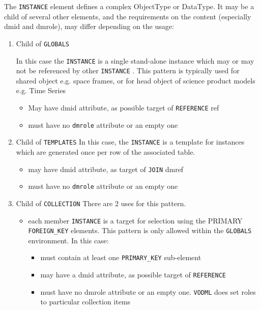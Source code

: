The \texttt{INSTANCE} element defines a complex ObjectType or DataType.
It may be a child of several other elements, and the requirements on
the content (especially dmid and dmrole), may differ depending on
the usage:


\begin{enumerate}
\item Child of \texttt{GLOBALS}

   In this case the \texttt{INSTANCE} is a single stand-alone instance which
   may or may not be referenced by other \texttt{INSTANCE} . This pattern is typically used for 
   shared object e.g. space frames, or for head object of science product models e.g. Time Series
  \begin{itemize}
     \item May have dmid attribute, as possible target of \texttt{REFERENCE} ref
     \item must have no  \texttt{dmrole} attribute or an empty one
  \end{itemize}  
     
\item Child of \texttt{TEMPLATES} 
  In this case, the \texttt{INSTANCE} is a template for instances which
  are generated once per row of the associated table.  
  \begin{itemize}
     \item may have dmid attribute, as target of \texttt{JOIN} dmref
     \item must have no  \texttt{dmrole} attribute or an empty one
  \end{itemize}  

\item Child of \texttt{COLLECTION} 
  There are 2 uses for this pattern.  
  \begin{itemize}
     \item each member \texttt{INSTANCE} is a target for selection using
           the PRIMARY \texttt{FOREIGN\_KEY} elements. This pattern is only 
           allowed within the \texttt{GLOBALS} environment. In this case:             
           \begin{itemize}
             \item must contain at least one \texttt{PRIMARY\_KEY} sub-element
             \item may have a dmid attribute, as possible target of \texttt{REFERENCE}              \item must have no  dmrole attribute or an empty one. \texttt{VODML} does set roles to particular collection items
           \end{itemize}


\end{itemize}
\end{enumerate}
